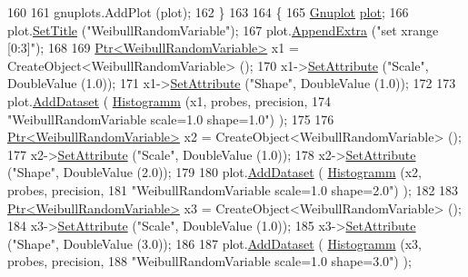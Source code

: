 \begin{DoxyCode}
160 
161     gnuplots.AddPlot (plot);
162   \}
163 
164   \{
165     \hyperlink{classns3_1_1Gnuplot}{Gnuplot} \hyperlink{lte__amc_8m_a5942306abe9f005572e4344e3cdef528}{plot};
166     plot.\hyperlink{classns3_1_1Gnuplot_ac01f15633d49f0239f8a45293a1e04f0}{SetTitle} (\textcolor{stringliteral}{"WeibullRandomVariable"});
167     plot.\hyperlink{classns3_1_1Gnuplot_a649a3041b9d0ea21a212b5ad9b28ecbf}{AppendExtra} (\textcolor{stringliteral}{"set xrange [0:3]"});
168 
169     \hyperlink{classns3_1_1Ptr}{Ptr<WeibullRandomVariable>} x1 = CreateObject<WeibullRandomVariable> ();
170     x1->\hyperlink{classns3_1_1ObjectBase_ac60245d3ea4123bbc9b1d391f1f6592f}{SetAttribute} (\textcolor{stringliteral}{"Scale"}, DoubleValue (1.0));
171     x1->\hyperlink{classns3_1_1ObjectBase_ac60245d3ea4123bbc9b1d391f1f6592f}{SetAttribute} (\textcolor{stringliteral}{"Shape"}, DoubleValue (1.0));
172 
173     plot.\hyperlink{classns3_1_1Gnuplot_a306ec724a327cf9ab699700f31fca0a1}{AddDataset} ( \hyperlink{main-random-variable_8cc_a2cfd3837ab3f2e816cf53486d7a186b5}{Histogramm} (x1, probes, precision,
174                                   \textcolor{stringliteral}{"WeibullRandomVariable scale=1.0 shape=1.0"}) );
175 
176     \hyperlink{classns3_1_1Ptr}{Ptr<WeibullRandomVariable>} x2 = CreateObject<WeibullRandomVariable> ();
177     x2->\hyperlink{classns3_1_1ObjectBase_ac60245d3ea4123bbc9b1d391f1f6592f}{SetAttribute} (\textcolor{stringliteral}{"Scale"}, DoubleValue (1.0));
178     x2->\hyperlink{classns3_1_1ObjectBase_ac60245d3ea4123bbc9b1d391f1f6592f}{SetAttribute} (\textcolor{stringliteral}{"Shape"}, DoubleValue (2.0));
179 
180     plot.\hyperlink{classns3_1_1Gnuplot_a306ec724a327cf9ab699700f31fca0a1}{AddDataset} ( \hyperlink{main-random-variable_8cc_a2cfd3837ab3f2e816cf53486d7a186b5}{Histogramm} (x2, probes, precision,
181                                   \textcolor{stringliteral}{"WeibullRandomVariable scale=1.0 shape=2.0"}) );
182 
183     \hyperlink{classns3_1_1Ptr}{Ptr<WeibullRandomVariable>} x3 = CreateObject<WeibullRandomVariable> ();
184     x3->\hyperlink{classns3_1_1ObjectBase_ac60245d3ea4123bbc9b1d391f1f6592f}{SetAttribute} (\textcolor{stringliteral}{"Scale"}, DoubleValue (1.0));
185     x3->\hyperlink{classns3_1_1ObjectBase_ac60245d3ea4123bbc9b1d391f1f6592f}{SetAttribute} (\textcolor{stringliteral}{"Shape"}, DoubleValue (3.0));
186 
187     plot.\hyperlink{classns3_1_1Gnuplot_a306ec724a327cf9ab699700f31fca0a1}{AddDataset} ( \hyperlink{main-random-variable_8cc_a2cfd3837ab3f2e816cf53486d7a186b5}{Histogramm} (x3, probes, precision,
188                                   \textcolor{stringliteral}{"WeibullRandomVariable scale=1.0 shape=3.0"}) );

\end{DoxyCode}
